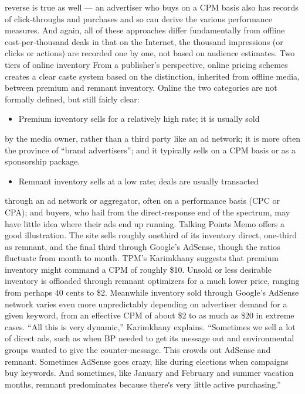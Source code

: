reverse is true as well — an advertiser who buys on a CPM basis also has
records of click‐throughs and purchases and so can derive the various
performance measures. And again, all of these approaches differ
fundamentally from offline cost‐per‐thousand deals in that on the
Internet, the thousand impressions (or clicks or actions) are recorded one
by one, not based on audience estimates.
Two tiers of online inventory
From a publisher’s perspective, online pricing schemes creates a clear
caste system based on the distinction, inherited from offline media,
between premium and remnant inventory. Online the two categories are
not formally defined, but still fairly clear:
\begin{itemize}
\item Premium inventory sells for a relatively high rate; it is usually sold
\end{itemize}
by the media owner, rather than a third party like an ad network; it
is more often the province of ``brand advertisers''; and it typically
sells on a CPM basis or as a sponsorship package.
\begin{itemize}
\item Remnant inventory sells at a low rate; deals are usually transacted
\end{itemize}
through an ad network or aggregator, often on a performance basis
(CPC or CPA); and buyers, who hail from the direct‐response end
of the spectrum, may have little idea where their ads end up
running.
Talking Points Memo offers a good illustration. The site sells roughly onethird
of its inventory direct, one‐third as remnant, and the final third
through Google’s AdSense, though the ratios fluctuate from month to
month. TPM’s Karimkhany suggests that premium inventory might
command a CPM of roughly \$10. Unsold or less desirable inventory is
offloaded through remnant optimizers for a much lower price, ranging
from perhaps 40 cents to \$2. Meanwhile inventory sold through Google’s
AdSense network varies even more unpredictably depending on
advertiser demand for a given keyword, from an effective CPM of about
\$2 to as much as \$20 in extreme cases.
``All this is very dynamic,'' Karimkhany explains. ``Sometimes we sell a lot
of direct ads, such as when BP needed to get its message out and
environmental groups wanted to give the counter‐message. This crowds
out AdSense and remnant. Sometimes AdSense goes crazy, like during
elections when campaigns buy keywords. And sometimes, like January
and February and summer vacation months, remnant predominates
because thereʹs very little active purchasing.''
